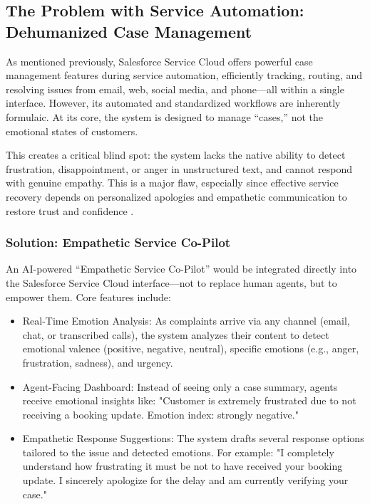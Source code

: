 \subsection{The Problem with Service Automation: Dehumanized Case Management}

As mentioned previously, Salesforce Service Cloud offers powerful case management features during service automation, efficiently tracking, routing, and resolving issues from email, web, social media, and phone—all within a single interface. However, its automated and standardized workflows are inherently formulaic. At its core, the system is designed to manage “cases,” not the emotional states of customers.

This creates a critical blind spot: the system lacks the native ability to detect frustration, disappointment, or anger in unstructured text, and cannot respond with genuine empathy. This is a major flaw, especially since effective service recovery depends on personalized apologies and empathetic communication to restore trust and confidence \cite{ahmadi2021}.

\subsubsection{Solution: Empathetic Service Co-Pilot}

An AI-powered “Empathetic Service Co-Pilot” would be integrated directly into the Salesforce Service Cloud interface—not to replace human agents, but to empower them. Core features include: 

\begin{itemize}
    \item Real-Time Emotion Analysis: As complaints arrive via any channel (email, chat, or transcribed calls), the system analyzes their content to detect emotional valence (positive, negative, neutral), specific emotions (e.g., anger, frustration, sadness), and urgency.
    \item Agent-Facing Dashboard: Instead of seeing only a case summary, agents receive emotional insights like: "Customer is extremely frustrated due to not receiving a booking update. Emotion index: strongly negative."
    \item Empathetic Response Suggestions: The system drafts several response options tailored to the issue and detected emotions. For example: "I completely understand how frustrating it must be not to have received your booking update. I sincerely apologize for the delay and am currently verifying your case."
\end{itemize}

